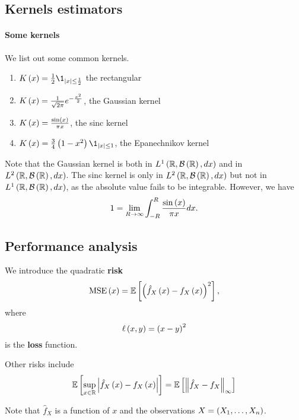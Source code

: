 

\subsection{Kernels estimators}
\paragraph{Some kernels} We list out some common kernels.
\begin{enumerate}
    \item \label{ker:rect} $K\pa{x}=\frac{1}{2}\1_{\abs{x}\le \frac{1}{2}}$ the rectangular
  \item\label{ker:gauss} $K\left(x\right) = \frac{1}{\sqrt{2\pi}} e^{-\frac{x^2}{2}}$, the Gaussian kernel
  \item\label{ker:sinc} $K\left(x\right) = \frac{\sin\left(x\right)}{\pi x}$, the sinc kernel
  \item \label{ker:epan} $K\pa{x} = \frac{3}{4}\pa{1-x^2}\1_{\abs{x}\le 1}$, the Epanechnikov kernel
\end{enumerate}
\begin{remark}
    Note that the Gaussian kernel is both in $L^1\left(\mathbb{R},\mathcal{B}\left(\mathbb{R}\right),dx\right)$ and in $L^2\left(\mathbb{R},\mathcal{B}\left(\mathbb{R}\right),dx\right)$. The sinc kernel is only in $L^2\left(\mathbb{R},\mathcal{B}\left(\mathbb{R}\right),dx\right)$ but not in $L^1\left(\mathbb{R},\mathcal{B}\left(\mathbb{R}\right),dx\right)$, as the absolute value fails to be integrable. However, we have
\begin{equation*}
  1 = \lim_{R\rightarrow \infty}\int_{-R}^R \frac{\sin\left(x\right)}{\pi x} dx.
\end{equation*}
\end{remark}

\subsection{Performance analysis}
\begin{definition}
  We introduce the quadratic \textbf{risk}
  \begin{equation*}
    \mathrm{MSE}\left(x\right) = \mathbb{E}\left[\left(\hat{f}_X\left(x\right) - f_X\left(x\right)\right)^2\right],
  \end{equation*}
  where
  \begin{equation*}
    \ell\left(x,y\right) = \left(x-y\right)^2
  \end{equation*}
  is the \textbf{loss} function.

  Other risks include
  \begin{equation*}
    \mathbb{E}\left[\sup_{x\in \mathbb{R}} \left| \hat{f}_X\left(x\right)-f_X\left(x\right)\right|\right] = \mathbb{E}\left[\left\| \hat{f}_X-f_X  \right\|_\infty\right]
  \end{equation*}
\end{definition}
Note that $\hat{f}_X$ is a function of $x$ and the observations $X= \left(X_1,\ldots, X_n\right)$.

